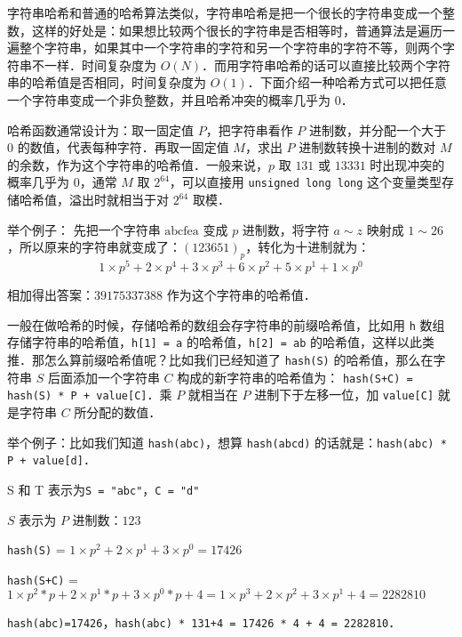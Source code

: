 
字符串哈希和普通的哈希算法类似，字符串哈希是把一个很长的字符串变成一个整数，这样的好处是：如果想比较两个很长的字符串是否相等时，普通算法是遍历一遍整个字符串，如果其中一个字符串的字符和另一个字符串的字符不等，则两个字符串不一样．时间复杂度为 $O(N)$．而用字符串哈希的话可以直接比较两个字符串的哈希值是否相同，时间复杂度为 $O(1)$．下面介绍一种哈希方式可以把任意一个字符串变成一个非负整数，并且哈希冲突的概率几乎为 $0$．

哈希函数通常设计为：取一固定值 $P$，把字符串看作 $P$ 进制数，并分配一个大于 $0$ 的数值，代表每种字符．再取一固定值 $M$，求出 $P$ 进制数转换十进制的数对 $M$ 的余数，作为这个字符串的哈希值．一般来说，$p$ 取 $131$ 或 $13331$ 时出现冲突的概率几乎为 $0$，通常 $M$ 取 $2^{64}$，可以直接用 \verb|unsigned long long| 这个变量类型存储哈希值，溢出时就相当于对 $2^{64}$ 取模．

举个例子：
先把一个字符串 $\text{abcfea}$ 变成 $p$ 进制数，将字符 $a \sim z$ 映射成 $1 \sim 26$，所以原来的字符串就变成了：$(123651)_p$，转化为十进制就为：\begin{equation}
1 \times p^5 + 2 \times p^4 + 3 \times p^3 + 6 \times p^2 + 5 \times p^1 + 1 \times p^0
\end{equation}

相加得出答案：$39175337388$ 作为这个字符串的哈希值．

一般在做哈希的时候，存储哈希的数组会存字符串的前缀哈希值，比如用 \verb|h| 数组存储字符串的哈希值，\verb|h[1] = a| 的哈希值，\verb|h[2] = ab| 的哈希值，这样以此类推．那怎么算前缀哈希值呢？比如我们已经知道了 \verb|hash(S)| 的哈希值，那么在字符串 $S$ 后面添加一个字符串 $C$ 构成的新字符串的哈希值为： \verb|hash(S+C) = hash(S) * P + value[C]|．乘 $P$ 就相当在 $P$ 进制下于左移一位，加 \verb|value[C]| 就是字符串 $C$ 所分配的数值．

举个例子：比如我们知道 \verb|hash(abc)|，想算 \verb|hash(abcd)| 的话就是：\verb|hash(abc) * P + value[d]|．

S 和 T 表示为\verb|S = "abc"|，\verb|C = "d"|

$S$ 表示为 $P$ 进制数：$123$

\verb|hash(S)| = $1 \times p^2 + 2 \times p^1 + 3 \times p^0=17426 $

\verb|hash(S+C)| = $1 \times p^2 *p + 2 \times p^1*p + 3 \times p^0*p + 4 = 1 \times p^3 + 2 \times p ^ 2 + 3 \times p^1 + 4=2282810 $

\verb|hash(abc)=17426|，\verb|hash(abc) * 131+4 = 17426 * 4 + 4 = 2282810|．


